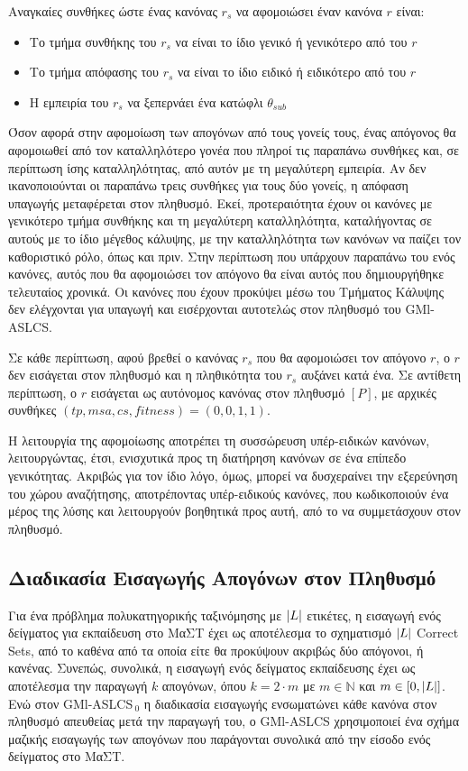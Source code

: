 Αναγκαίες συνθήκες ώστε ένας κανόνας $r_{s}$ να αφομοιώσει έναν κανόνα $r$ είναι:
\begin{itemize}
\item Το τμήμα συνθήκης του $r_{s}$ να είναι το ίδιο γενικό ή γενικότερο από του $r$
\item Το τμήμα απόφασης του $r_{s}$ να είναι το ίδιο ειδικό ή ειδικότερο από του $r$
\item Η εμπειρία του $r_{s}$ να ξεπερνάει ένα κατώφλι $\theta_{sub}$
\end{itemize}
   		
Όσον αφορά στην αφομοίωση των απογόνων από τους γονείς τους, ένας απόγονος θα αφομοιωθεί από τον καταλληλότερο γονέα που πληροί τις παραπάνω συνθήκες και, σε περίπτωση ίσης καταλληλότητας, από αυτόν με τη μεγαλύτερη εμπειρία. Αν δεν ικανοποιούνται οι παραπάνω τρεις συνθήκες για τους δύο γονείς, η απόφαση υπαγωγής μεταφέρεται στον πληθυσμό. Εκεί, προτεραιότητα έχουν οι κανόνες με γενικότερο τμήμα συνθήκης και τη μεγαλύτερη καταλληλότητα, καταλήγοντας σε αυτούς με το ίδιο μέγεθος κάλυψης, με την καταλληλότητα των κανόνων να παίζει τον καθοριστικό ρόλο, όπως και πριν. Στην περίπτωση που υπάρχουν παραπάνω του ενός κανόνες, αυτός που θα αφομοιώσει τον απόγονο θα είναι αυτός που δημιουργήθηκε τελευταίος χρονικά. Οι κανόνες που έχουν προκύψει μέσω του Τμήματος Κάλυψης δεν ελέγχονται για υπαγωγή και εισέρχονται αυτοτελώς στον πληθυσμό του GMl-ASLCS.

Σε κάθε περίπτωση, αφού βρεθεί ο κανόνας $r_{s}$ που θα αφομοιώσει τον απόγονο $r$, ο $r$ δεν εισάγεται στον πληθυσμό και η πληθικότητα του $r_{s}$ αυξάνει κατά ένα. Σε αντίθετη περίπτωση, ο $r$ εισάγεται ως αυτόνομος κανόνας στον πληθυσμό $[P]$, με αρχικές συνθήκες $(tp, msa, cs, fitness) = (0,0,1,1)$.

Η λειτουργία της αφομοίωσης αποτρέπει τη συσσώρευση υπέρ-ειδικών κανόνων, λειτουργώντας, έτσι, ενισχυτικά προς τη διατήρηση κανόνων σε ένα επίπεδο γενικότητας. Ακριβώς για τον ίδιο λόγο, όμως, μπορεί να δυσχεραίνει την εξερεύνηση του χώρου αναζήτησης, αποτρέποντας υπέρ-ειδικούς κανόνες, που κωδικοποιούν ένα μέρος της λύσης και λειτουργούν βοηθητικά προς αυτή, από το να συμμετάσχουν στον πληθυσμό.


\subsection{Διαδικασία Εισαγωγής Απογόνων στον Πληθυσμό}
Για ένα πρόβλημα πολυκατηγορικής ταξινόμησης με $\lvert L\rvert$ ετικέτες, η εισαγωγή ενός δείγματος για εκπαίδευση στο ΜαΣΤ έχει ως αποτέλεσμα το σχηματισμό $\lvert L\rvert$ Correct Sets, από το καθένα από τα οποία είτε θα προκύψουν ακριβώς δύο απόγονοι, ή κανένας. Συνεπώς, συνολικά, η εισαγωγή ενός δείγματος εκπαίδευσης έχει ως αποτέλεσμα την παραγωγή $k$ απογόνων, όπου $k=2 \cdot m$ με $m \in \mathbb{N}$ και $m \in [0,\lvert L\rvert]$. Ενώ στον GMl-ASLCS$_{\:0}$ η διαδικασία εισαγωγής ενσωματώνει κάθε κανόνα στον πληθυσμό απευθείας μετά την παραγωγή του, ο GMl-ASLCS χρησιμοποιεί ένα σχήμα μαζικής εισαγωγής των απογόνων που παράγονται συνολικά από την είσοδο ενός δείγματος στο ΜαΣΤ.

